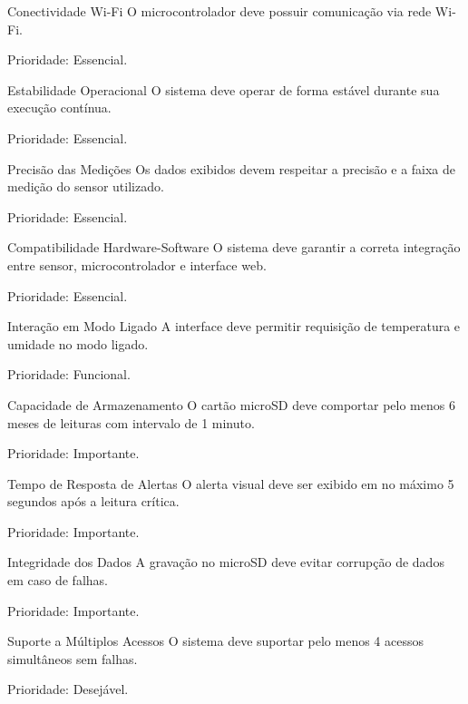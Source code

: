 \begin{nfreq}{Conectividade Wi-Fi}
O microcontrolador deve possuir comunicação via rede Wi-Fi.

Prioridade:  Essencial.
\end{nfreq}

\begin{nfreq}{Estabilidade Operacional}
O sistema deve operar de forma estável durante sua execução contínua.

Prioridade: Essencial.
\end{nfreq}

\begin{nfreq}{Precisão das Medições}
Os dados exibidos devem respeitar a precisão e a faixa de medição do sensor utilizado.

Prioridade:  Essencial.
\end{nfreq}

\begin{nfreq}{Compatibilidade Hardware-Software}
O sistema deve garantir a correta integração entre sensor, microcontrolador e interface web.

Prioridade:  Essencial.
\end{nfreq}

\begin{nfreq}{Interação em Modo Ligado}
A interface deve permitir requisição de temperatura e umidade no modo ligado.

Prioridade:  Funcional.
\end{nfreq}

\begin{nfreq}{Capacidade de Armazenamento}
O cartão microSD deve comportar pelo menos 6 meses de leituras com intervalo de 1 minuto.

Prioridade:  Importante.
\end{nfreq}

\begin{nfreq}{Tempo de Resposta de Alertas}
O alerta visual deve ser exibido em no máximo 5 segundos após a leitura crítica.

Prioridade:  Importante.
\end{nfreq}

\begin{nfreq}{Integridade dos Dados}
A gravação no microSD deve evitar corrupção de dados em caso de falhas.

Prioridade:  Importante.
\end{nfreq}

\begin{nfreq}{Suporte a Múltiplos Acessos}
O sistema deve suportar pelo menos 4 acessos simultâneos sem falhas.

Prioridade:  Desejável.
\end{nfreq}

